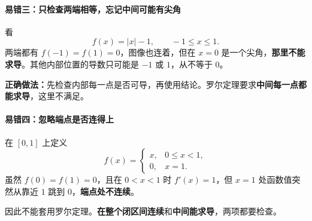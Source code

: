 \begin{trapbox}
\par\medskip
\noindent\begin{minipage}{\linewidth}
\paragraph{易错三：只检查两端相等，忘记中间可能有尖角}
\begin{center}\end{center}
\end{minipage}\par\medskip

看
\[
f(x)=|x|-1,\qquad -1\le x\le1.
\]
两端都有 $f(-1)=f(1)=0$，图像也连着，但在 $x=0$ 是一个尖角，\textbf{那里不能求导}。其他内部位置的导数只可能是 $-1$ 或 $1$，从不等于 $0$。

\textbf{正确做法：}先检查内部每一点是否可导，再使用结论。罗尔定理要求\textbf{中间每一点都能求导}，这里不满足。
\end{trapbox}
\clearpage
\begin{trapbox}
\par\medskip
\noindent\begin{minipage}{\linewidth}
\paragraph{易错四：忽略端点是否连得上}
\begin{center}\end{center}
\end{minipage}\par\medskip

在 $[0,1]$ 上定义
\[
f(x)=\begin{cases}x,&0\le x<1,\\0,&x=1.\end{cases}
\]
虽然 $f(0)=f(1)=0$，且在 $0<x<1$ 时 $f'(x)=1$，但 $x=1$ 处函数值突然从靠近 $1$ 跳到 $0$，\textbf{端点处不连续}。

因此不能套用罗尔定理。\textbf{在整个闭区间连续}和\textbf{中间能求导}，两项都要检查。

\end{trapbox}
\clearpage
